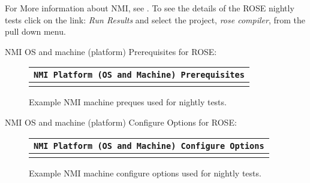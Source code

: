 For More information about NMI, see
.
To see the details of the ROSE nightly tests click on the link: {\em Run Results}
and select the project, {\em rose compiler}, from the pull down menu.


   NMI OS and machine (platform) Prerequisites for ROSE:
{\indent
\begin{latexonly}
\begin{figure}[tb]
\begin{center}
\begin{tabular}{|c|} \hline
     {\tt NMI Platform (OS and Machine) Prerequisites}
\\\hline\hline
{
\scriptsize
   
}
\\\hline
\end{tabular}
\end{center}
\caption{ Example NMI machine preques used for nightly tests. }
\end{figure}
\end{latexonly}
\label{NMI:prerequisites}
}

   NMI OS and machine (platform) Configure Options for ROSE:
{\indent
\begin{latexonly}
\begin{figure}[tb]
\begin{center}
\begin{tabular}{|c|} \hline
     {\tt NMI Platform (OS and Machine) Configure Options}
\\\hline\hline
{
\scriptsize
   
}
\\\hline
\end{tabular}
\end{center}
\caption{ Example NMI machine configure options used for nightly tests. }
\end{figure}
\end{latexonly}
\label{NMI:configureOptions}
}

